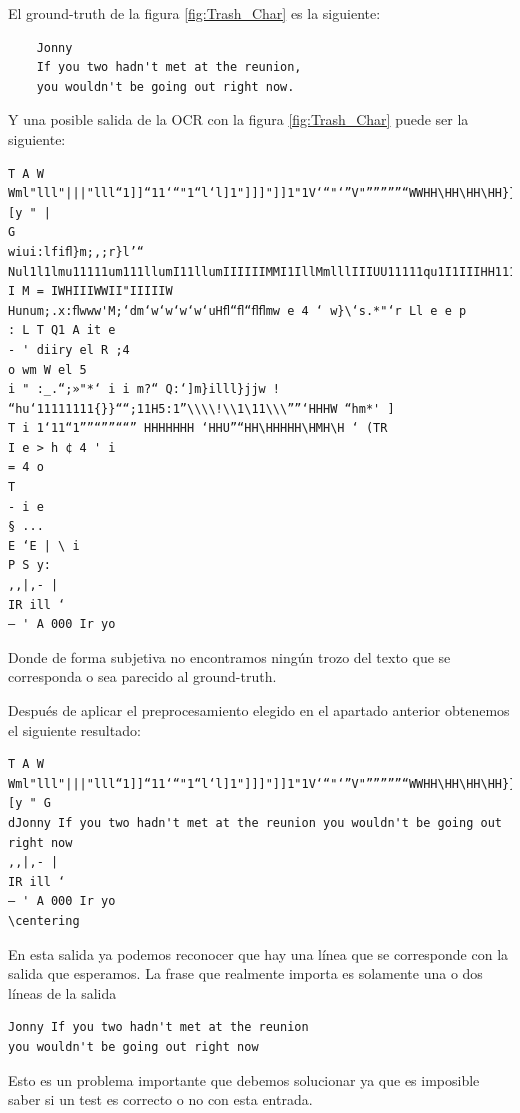 El ground-truth de la figura \ref{fig:Trash_Char} es la siguiente:
\begin{verbatim}
	Jonny
	If you two hadn't met at the reunion,
	you wouldn't be going out right now.
\end{verbatim}
Y una posible salida de la OCR con la figura \ref{fig:Trash_Char} puede ser la siguiente:
\begin{verbatim}
T A W
Wml"lll"|||"lll“1]]“11‘“"1“l‘l]1"]]]"]]1"1V‘“"‘”V"”””””“WWHH\HH\HH\HH}}}}111111111”‘””}"“H‘H”H‘mwwmm‘ [y " |
G
wiui:lfiﬂ}m;,;r}l’“
Nul1l1lmu11111um111llumI11llumIIIIIIMMI1IllMmlllIIIUU11111qu1I1IIIHH111111HMIIIIIIMMIII1llMMIIIIIIIIII11IIIIIIIIIIIIIIIIIIIIIII1HmIIIIIMIMIIII1“MIIIIIIIIIIII11||m"||11IIMMIIlll“i“1IIIIIMMllllilﬂU‘Wl“i“ii111HM11111IIUIiiiii“i“ii11IIIIIIIIIIIIIIIIIIIIIIII:“‘ I M = IWHIIIWWII"IIIIIW
Hunum;.x:ﬂwww'M;‘dm‘w‘w‘w‘w‘uHﬂ“ﬂ“ﬂﬂmw e 4 ‘ w}\‘s.*"‘r Ll e e p
: L T Q1 A it e
- ' diiry el R ;4
o wm W el 5
i " :_.“;»"*‘ i i m?“ Q:‘]m}illl}jjw ! “hu‘11111111{}}““;11H5:1”\\\\!\\1\11\\\””‘HHHW “hm*' ]
T i 1‘11“1””“””““” HHHHHHH ‘HHU”“HH\HHHHH\HMH\H ‘ (TR
I e > h ¢ 4 ' i
= 4 o
T
- i e
§ ...
E ‘E | \ i
P S y:
,,|,- |
IR ill ‘
— ' A 000 Ir yo
\end{verbatim}

Donde de forma subjetiva no encontramos ningún trozo del texto que se corresponda o sea parecido al ground-truth.

Después de aplicar el preprocesamiento elegido en el apartado anterior obtenemos el siguiente resultado:

\begin{verbatim}
T A W
Wml"lll"|||"lll“1]]“11‘“"1“l‘l]1"]]]"]]1"1V‘“"‘”V"”””””“WWHH\HH\HH\HH}}}}111111111”‘””}"“H‘H”H‘mwwmm‘ [y " G
dJonny If you two hadn't met at the reunion you wouldn't be going out right now
,,|,- |
IR ill ‘
— ' A 000 Ir yo
\centering
\end{verbatim}

En esta salida ya podemos reconocer que hay una línea que se corresponde con la salida que esperamos.
La frase que realmente importa es solamente una o dos líneas de la salida
\begin{verbatim}
Jonny If you two hadn't met at the reunion
you wouldn't be going out right now
\end{verbatim}
Esto es un problema importante que debemos solucionar ya que es imposible saber si un test es correcto o no con esta entrada.

